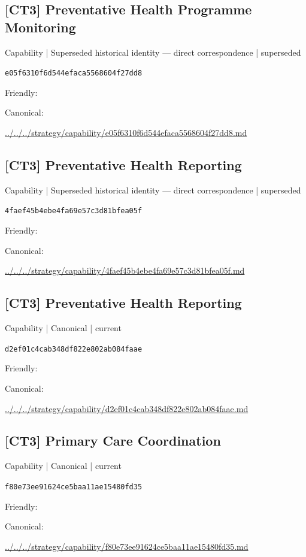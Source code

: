 \documentclass[10pt,a4paper]{article}
\begin{document}
\subsection*{[CT3] Preventative Health Programme Monitoring}
{\small Capability | Superseded historical identity — direct correspondence | superseded}\par
\texttt{e05f6310f6d544efaca5568604f27dd8}\par
Friendly: \par
Canonical: \par
{\footnotesize\url{../../../strategy/capability/e05f6310f6d544efaca5568604f27dd8.md}}\par
\subsection*{[CT3] Preventative Health Reporting}
{\small Capability | Superseded historical identity — direct correspondence | superseded}\par
\texttt{4faef45b4ebe4fa69e57c3d81bfea05f}\par
Friendly: \par
Canonical: \par
{\footnotesize\url{../../../strategy/capability/4faef45b4ebe4fa69e57c3d81bfea05f.md}}\par
\subsection*{[CT3] Preventative Health Reporting}
{\small Capability | Canonical | current}\par
\texttt{d2ef01c4cab348df822e802ab084faae}\par
Friendly: \par
Canonical: \par
{\footnotesize\url{../../../strategy/capability/d2ef01c4cab348df822e802ab084faae.md}}\par
\subsection*{[CT3] Primary Care Coordination}
{\small Capability | Canonical | current}\par
\texttt{f80e73ee91624ce5baa11ae15480fd35}\par
Friendly: \par
Canonical: \par
{\footnotesize\url{../../../strategy/capability/f80e73ee91624ce5baa11ae15480fd35.md}}\par
\end{document}
